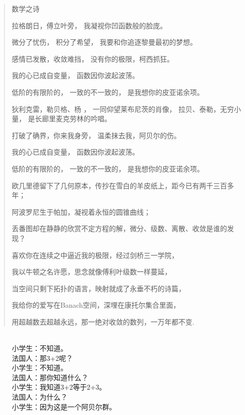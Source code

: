 \begin{quote}
    \kaishu
    \centerline{数学之诗}
    拉格朗日，傅立叶旁， 我凝视你凹函数般的脸庞。 

    微分了忧伤， 积分了希望， 我要和你追逐黎曼最初的梦想。

    感情已发散，收敛难挡， 没有你的极限，柯西抓狂。

    我的心已成自变量， 函数因你波起波荡。

    低阶的有限阶的， 一致的不一致的， 是我想你的皮亚诺余项。

    狄利克雷，勒贝格、杨 ， 一同仰望莱布尼茨的肖像， 拉贝、泰勒，无穷小量， 是长廊里麦克劳林的吟唱。

    打破了确界，你来我身旁， 温柔抹去我，阿贝尔的伤。

    我的心已成自变量， 函数因你波起波荡。

    低阶的有限阶的， 一致的不一致的， 是我想你的皮亚诺余项。

    欧几里德留下了几何原本，传抄在雪白的羊皮纸上，距今已有两千三百多年；     

    阿波罗尼生于帕加，凝视着永恒的圆锥曲线； 

    丢番图却在静静的欣赏不定方程的解，微分、级数、离散、收敛是谁的发现？         

    喜欢你在连续之中逼近我的极限，经过剑桥三一学院，

    我以牛顿之名许愿，思念就像傅利叶级数一样蔓延，

    当空间只剩下拓扑的语言，映射就成了永垂不朽的诗篇，

    我给你的爱写在Banach空间，深埋在康托尔集合里面，

    用超越数去超越永远，那一绝对收敛的数列，一万年都不变.
    \end{quote}

    \vspace*{0.3\linewidth}
    \begin{figure}[!htb]
    \begin{minipage}[t]{0.4\linewidth}
        \mbox{}
    \end{minipage}
    \hfill
    \begin{minipage}[t]{0.5\linewidth}
        \begin{QuoteEnv}[法国教育改革笑话]{}
           \\
            小学生：不知道。\\
            法国人：那3+2呢？\\
            小学生：不知道。\\
            法国人：那你知道什么？\\
            小学生：我知道3+2等于2+3。\\
            法国人：为什么？\\
            小学生：因为这是一个阿贝尔群。\\
        \end{QuoteEnv}        
    \end{minipage}
    \end{figure}
